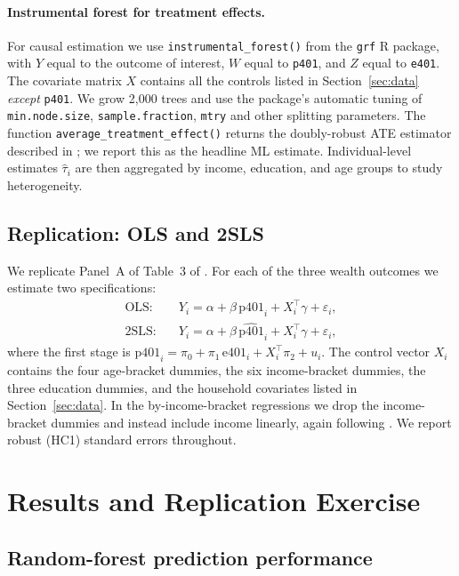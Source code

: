 \documentclass[11pt]{article}
\begin{document}
\paragraph{Instrumental forest for treatment effects.}
For causal estimation we use \texttt{instrumental\_forest()} from the
\texttt{grf} R package, with $Y$ equal to the outcome of interest, $W$ equal
to \texttt{p401}, and $Z$ equal to \texttt{e401}.  The covariate matrix $X$
contains all the controls listed in Section~\ref{sec:data} \emph{except}
\texttt{p401}.  We grow 2{,}000 trees and use the package's automatic tuning
of \texttt{min.node.size}, \texttt{sample.fraction}, \texttt{mtry} and other
splitting parameters.  The function \texttt{average\_treatment\_effect()}
returns the doubly-robust ATE estimator described in
\cite{athey2019grf}; we report this as the headline ML estimate.
Individual-level estimates $\hat\tau_i$ are then aggregated by income,
education, and age groups to study heterogeneity.

\subsection{Replication: OLS and 2SLS}

We replicate Panel~A of Table~3 of \cite{ch2004}.  For each of the three
wealth outcomes we estimate two specifications:
\begin{align}
  \text{OLS:}\quad & Y_i = \alpha + \beta \, \text{p401}_i + X_i^\top \gamma + \varepsilon_i, \label{eq:ols}\\
  \text{2SLS:}\quad & Y_i = \alpha + \beta \, \widehat{\text{p401}}_i + X_i^\top \gamma + \varepsilon_i, \label{eq:2sls}
\end{align}
where the first stage is
$\text{p401}_i = \pi_0 + \pi_1 \, \text{e401}_i + X_i^\top \pi_2 + u_i$.
The control vector $X_i$ contains the four age-bracket dummies, the six
income-bracket dummies, the three education dummies, and the household
covariates listed in Section~\ref{sec:data}.  In the by-income-bracket
regressions we drop the income-bracket dummies and instead include income
linearly, again following \cite{ch2004}.  We report robust (HC1) standard
errors throughout.

\section{Results and Replication Exercise}\label{sec:results}

\subsection{Random-forest prediction performance}
\end{document}
